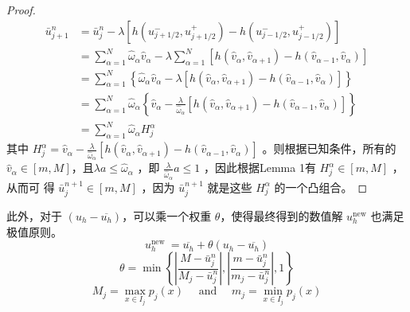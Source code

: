 \documentclass{article}
\numberwithin{equation}{subsection}    %
\begin{document}
\begin{proof}
    \begin{equation}
        \begin{aligned}
            \bar{u}_{j+1}^{n} & =\bar{u}_{j}^{n}-\lambda\left[h\left(u_{j+1 / 2}^{-}, u_{j+1 / 2}^{+}\right)-h\left(u_{j-1 / 2}^{-}, u_{j-1 / 2}^{+}\right)\right]                                                                                                \\
                              & =\sum_{\alpha=1}^{N} \hat{\omega}_{\alpha} \hat{v}_{\alpha}-\lambda \sum_{\alpha=1}^{N}\left[h\left(\hat{v}_{\alpha}, \hat{v}_{\alpha+1}\right)-h\left(\hat{v}_{\alpha-1}, \hat{v}_{\alpha}\right)\right]                         \\
                              & =\sum_{\alpha=1}^{N}\left\{\hat{\omega}_{\alpha} \hat{v}_{\alpha}-\lambda\left[h\left(\hat{v}_{\alpha}, \hat{v}_{\alpha+1}\right)-h\left(\hat{v}_{\alpha-1}, \hat{v}_{\alpha}\right)\right]\right\}                               \\
                              & =\sum_{\alpha=1}^{N} \hat{\omega}_{\alpha}\left\{\hat{v}_{\alpha}-\frac{\lambda}{\hat{\omega}_{\alpha}}\left[h\left(\hat{v}_{\alpha}, \hat{v}_{\alpha+1}\right)-h\left(\hat{v}_{\alpha-1}, \hat{v}_{\alpha}\right)\right]\right\} \\
                              & =\sum_{\alpha=1}^{N} \hat{\omega}_{\alpha} H_{j}^{\alpha}
        \end{aligned}
    \end{equation}
    其中  $H_{j}^{\alpha}=\hat{v}_{\alpha}-\frac{\lambda}{\hat{\omega}_{\alpha}}\left[h\left(\hat{v}_{\alpha}, \hat{v}_{\alpha+1}\right)-h\left(\hat{v}_{\alpha-1}, \hat{v}_{\alpha}\right)\right]$  。则根据已知条件，所有的 $\hat{v}_{\alpha} \in[m, M]  ，且  \lambda a \leq \hat{\omega}_{\alpha} $ ，即 $\frac{\lambda}{\hat{\omega}_{\alpha}} a \leq 1$  ，因此根据Lemma 1有 $H_{j}^{\alpha} \in[m, M]$ ，从而可 得  $\bar{u}_{j}^{n+1} \in[m, M]$  ，因为  $\bar{u}_{j}^{n+1}$  就是这些  $H_{j}^{\alpha}$ 的一个凸组合。
\end{proof}

此外，对于 $(u_h-\overline{u_h})$，可以乘一个权重 $\theta$，使得最终得到的数值解 $u_h^{\text{new}}$ 也满足极值原则。
\begin{equation}
    u_{h}^{\text {new }}=\overline{u_h}+\theta(u_h-\overline{u_h})
\end{equation}
\begin{equation}
    \theta=\min \left\{\left|\frac{M-\bar{u}_{j}^{n}}{M_{j}-\bar{u}_{j}^{n}}\right|,\left|\frac{m-\bar{u}_{j}^{n}}{m_{j}-\bar{u}_{j}^{n}}\right|, 1\right\}
\end{equation}
\begin{equation}
    M_{j}=\max _{x \in I_{j}} p_{j}(x) \quad \text { and } \quad m_{j}=\min _{x \in I_{j}} p_{j}(x)
\end{equation}
\end{document}
